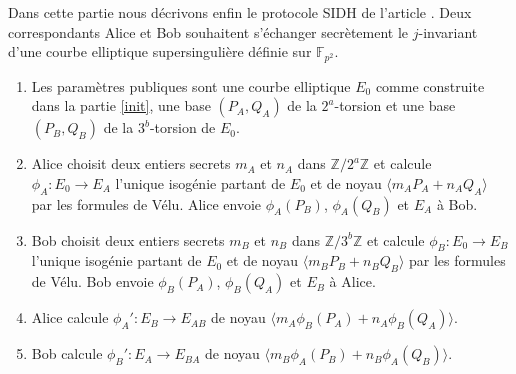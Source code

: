 \documentclass{article}
\theoremstyle{plain}%
\theoremstyle{definition}%
\newcommand{\F}{\mathbb{F}}
\newcommand{\Z}{\mathbb{Z}}
\begin{document}
Dans cette partie nous décrivons enfin le protocole SIDH de l'article \cite{DeFeo}. Deux correspondants Alice et Bob souhaitent s'échanger secrètement le $j$-invariant d'une courbe elliptique supersingulière définie sur $\F_{p^2}$.



\begin{enumerate}
  \item Les paramètres publiques sont une courbe elliptique $E_0$ comme construite dans la partie \ref{init}, une base $(P_A, Q_A)$ de la $2^a$-torsion et une base $(P_B, Q_B)$ de la $3^b$-torsion de $E_0$.
\item Alice choisit deux entiers secrets $m_A$ et $n_A$ dans $\Z/2^a\Z$ et calcule $\phi_A : E_0 \to E_A$ l'unique isogénie partant de $E_0$ et de noyau $\langle m_AP_A +n_AQ_A \rangle$ par les formules de Vélu. Alice envoie $\phi_A(P_B)$, $\phi_A(Q_B)$ et $E_A$ à Bob.
  \item  
    Bob   choisit deux entiers secrets $m_B$ et $n_B$ dans $\Z/3^b\Z$ et calcule $\phi_B : E_0 \to E_B$ l'unique isogénie partant de $E_0$ et de noyau $\langle m_BP_B +n_BQ_B \rangle$ par les formules de Vélu. Bob envoie $\phi_B(P_A)$, $\phi_B(Q_A)$ et $E_B$ à Alice.
  \item Alice calcule $\phi_A' : E_B\to E_{AB}$ de noyau $\langle m_A\phi_B(P_A) + n_A\phi_B(Q_A)\rangle$.
  \item Bob calcule $\phi_B' : E_A\to E_{BA}$ de noyau $\langle m_B\phi_A(P_B) + n_B\phi_A(Q_B)\rangle$.
\end{enumerate}





\end{document}
